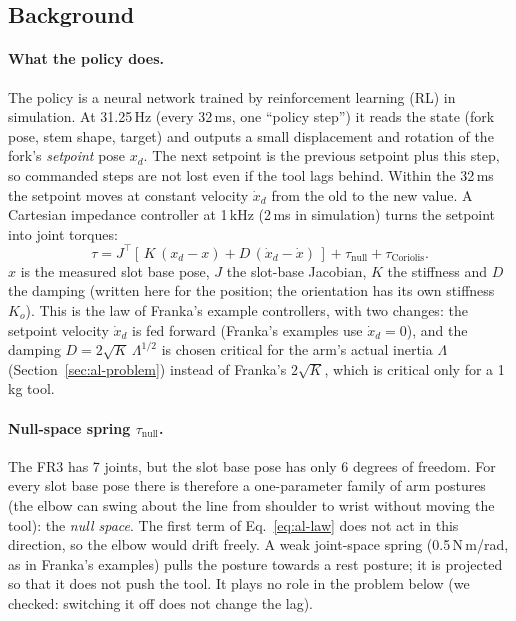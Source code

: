 \subsection{Background}
\label{sec:al-background}

\paragraph{What the policy does.} The policy is a neural network trained by reinforcement learning (RL) in
simulation. At 31.25\,Hz (every 32\,ms, one ``policy step'') it reads the state (fork pose, stem shape, target) and
outputs a small displacement and rotation of the fork's \emph{setpoint} pose $x_d$. The next setpoint is the previous
setpoint plus this step, so commanded steps are not lost even if the tool lags behind. Within the 32\,ms the setpoint
moves at constant velocity $\dot x_d$ from the old to the new value. A Cartesian impedance controller at 1\,kHz
(2\,ms in simulation) turns the setpoint into joint torques:
\begin{equation}
  \tau = J^\top\!\left[\,K\,(x_d - x) + D\,(\dot x_d - \dot x)\,\right] + \tau_\text{null} + \tau_\text{Coriolis}.
  \label{eq:al-law}
\end{equation}
$x$ is the measured slot base pose, $J$ the slot-base Jacobian, $K$ the stiffness and $D$ the damping (written here for
the position; the orientation has its own stiffness $K_o$). This is the law of Franka's example controllers, with
two changes: the setpoint velocity $\dot x_d$ is fed forward (Franka's examples use $\dot x_d = 0$), and the damping
$D = 2\sqrt{K}\,\Lambda^{1/2}$ is chosen critical for the arm's actual inertia $\Lambda$ (Section~\ref{sec:al-problem})
instead of Franka's $2\sqrt K$, which is critical only for a 1\,kg tool.

\paragraph{Null-space spring $\tau_\text{null}$.} The FR3 has 7 joints, but the slot base pose has only 6 degrees of
freedom. For every slot base pose there is therefore a one-parameter family of arm postures (the elbow can swing about the
line from shoulder to wrist without moving the tool): the \emph{null space}. The first term of
Eq.~\eqref{eq:al-law} does not act in this direction, so the elbow would drift freely. A weak joint-space spring
(0.5\,N\,m/rad, as in Franka's examples) pulls the posture towards a rest posture; it is projected so that it does
not push the tool. It plays no role in the problem below (we checked: switching it off does not change the lag).

